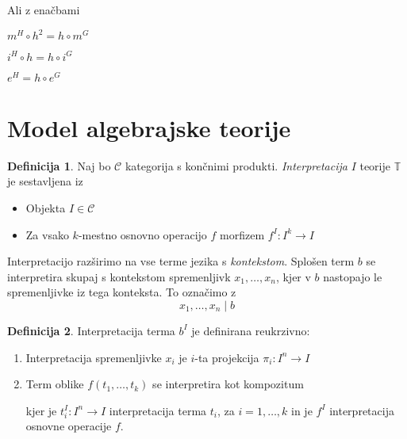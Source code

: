 \documentclass[12pt,a4paper]{book}
\theoremstyle{definition}
\newtheorem{definicija}{Definicija}[chapter]
\theoremstyle{plain}
\theoremstyle{definition}
\theoremstyle{remark}
\begin{document}
%
\begin{center}
\end{center}
Ali z enačbami
\begin{description}
\item $m^H \circ h^2 = h \circ m^G$
\item $i^H \circ h = h \circ i^G$
\item $e^H = h \circ e^G$
\end{description}
%
\section{Model algebrajske teorije}
%
\begin{definicija}
Naj bo $\mathcal{C}$ kategorija s končnimi produkti. \emph{Interpretacija} $I$ teorije $\mathbb{T}$ je sestavljena iz
\begin{itemize}
%
\item Objekta $I \in \mathcal{C}$
%
\item Za vsako $k$-mestno osnovno operacijo $f$ morfizem $f^I : I^k \to I$
\end{itemize}
%
Interpretacijo razširimo na vse terme jezika s \emph{kontekstom}. Splošen term $b$ se interpretira skupaj s kontekstom spremenljivk $x_1, \ldots, x_n$, kjer v $b$ nastopajo le spremenljivke iz tega konteksta. To označimo z
$$x_1, \ldots, x_n \mid b$$
\end{definicija}
%
\begin{definicija}
Interpretacija terma $b^I$ je definirana reukrzivno:
\begin{enumerate}
\item Interpretacija spremenljivke $x_i$ je $i$-ta projekcija $\pi_i : I^n \to I$
%
\item Term oblike $f(t_1, \ldots, t_k)$ se interpretira kot kompozitum 
\begin{center}
\end{center}
kjer je $t_i^I : I^n \to I$ interpretacija terma $t_i$, za $i = 1, \ldots, k$ in je $f^I$ interpretacija osnovne operacije $f$.
\end{enumerate}
\end{definicija}
\end{document}
